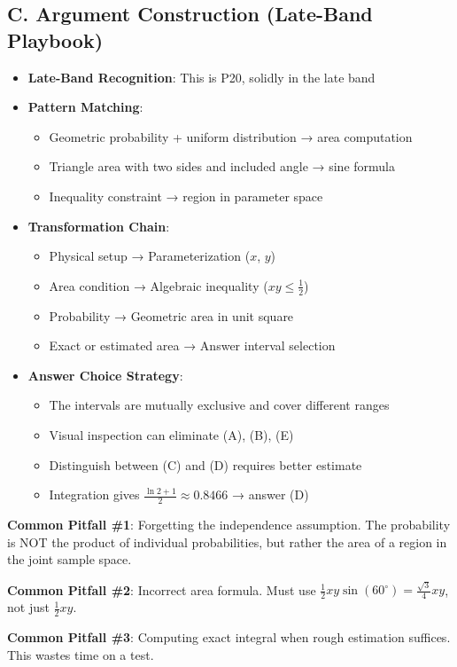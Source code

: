 \documentclass[11pt]{article}
\begin{document}
\begin{strategicbox}
\subsection*{C. Argument Construction (Late-Band Playbook)}
\begin{itemize}[leftmargin=*]
    \item \textbf{Late-Band Recognition}: This is P20, solidly in the late band
    
    \item \textbf{Pattern Matching}: 
    \begin{itemize}
        \item Geometric probability + uniform distribution → area computation
        \item Triangle area with two sides and included angle → sine formula
        \item Inequality constraint → region in parameter space
    \end{itemize}
    
    \item \textbf{Transformation Chain}: 
    \begin{itemize}
        \item Physical setup → Parameterization ($x$, $y$)
        \item Area condition → Algebraic inequality ($xy \leq \frac{1}{2}$)
        \item Probability → Geometric area in unit square
        \item Exact or estimated area → Answer interval selection
    \end{itemize}
    
    \item \textbf{Answer Choice Strategy}: 
    \begin{itemize}
        \item The intervals are mutually exclusive and cover different ranges
        \item Visual inspection can eliminate (A), (B), (E)
        \item Distinguish between (C) and (D) requires better estimate
        \item Integration gives $\frac{\ln 2 + 1}{2} \approx 0.8466$ → answer (D)
    \end{itemize}
\end{itemize}
\end{strategicbox}

\begin{warningbox}
\textbf{Common Pitfall \#1}: Forgetting the independence assumption. The probability is NOT the product of individual probabilities, but rather the area of a region in the joint sample space.

\textbf{Common Pitfall \#2}: Incorrect area formula. Must use $\frac{1}{2}xy\sin(60^\circ) = \frac{\sqrt{3}}{4}xy$, not just $\frac{1}{2}xy$.

\textbf{Common Pitfall \#3}: Computing exact integral when rough estimation suffices. This wastes time on a test.
\end{warningbox}
\end{document}
